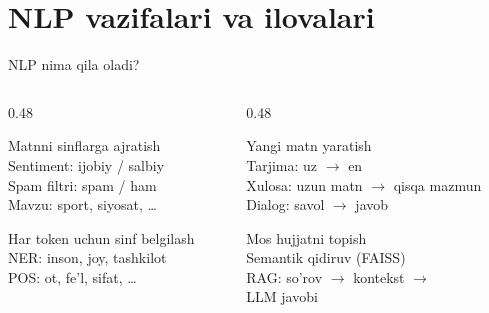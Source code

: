 \documentclass[aspectratio=169,11pt]{beamer}
\begin{document}
\section[NLP vazifalari]{NLP vazifalari va ilovalari}

\begin{frame}{NLP nima qila oladi?}
  \begin{columns}[T]
    \begin{column}{0.48\textwidth}
      \begin{tcolorbox}[defbox,title=Tasniflash (Classification)]
        \footnotesize
        Matnni sinflarga ajratish\\[2pt]
        \textbullet\; Sentiment: ijobiy / salbiy\\
        \textbullet\; Spam filtri: spam / ham\\
        \textbullet\; Mavzu: sport, siyosat, \ldots
      \end{tcolorbox}
      \vspace{5pt}
      \begin{tcolorbox}[defbox,title=Teglash (Sequence labeling)]
        \footnotesize
        Har token uchun sinf belgilash\\[2pt]
        \textbullet\; NER: inson, joy, tashkilot\\
        \textbullet\; POS: ot, fe'l, sifat, \ldots
      \end{tcolorbox}
    \end{column}
    \begin{column}{0.48\textwidth}
      \begin{tcolorbox}[defbox,title=Generatsiya (Generation)]
        \footnotesize
        Yangi matn yaratish\\[2pt]
        \textbullet\; Tarjima: uz $\to$ en\\
        \textbullet\; Xulosa: uzun matn $\to$ qisqa mazmun\\
        \textbullet\; Dialog: savol $\to$ javob
      \end{tcolorbox}
      \vspace{5pt}
      \begin{tcolorbox}[defbox,title=Qidiruv (Retrieval)]
        \footnotesize
        Mos hujjatni topish\\[2pt]
        \textbullet\; Semantik qidiruv (FAISS)\\
        \textbullet\; RAG: so'rov $\to$ kontekst $\to$\\
        \quad\quad\quad LLM javobi
      \end{tcolorbox}
    \end{column}
  \end{columns}
\end{frame}
\end{document}
